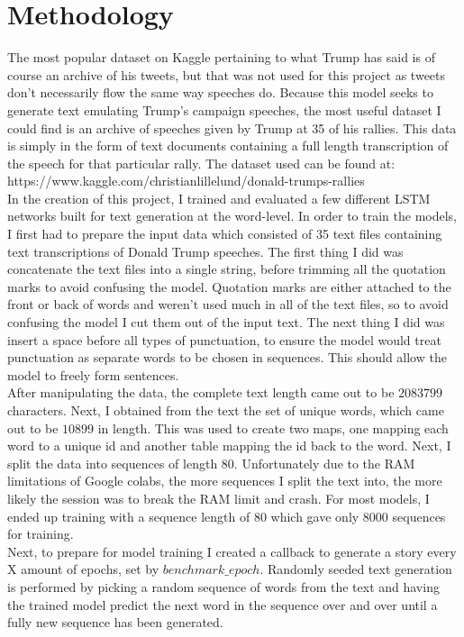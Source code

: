 \documentclass[a4paper]{article}
\begin{document}
\section{Methodology}

The most popular dataset on Kaggle pertaining to what Trump has said is of course an archive of his tweets, but that was not used for this project as tweets don't necessarily flow the same way speeches do. Because this model seeks to generate text emulating Trump's campaign speeches, the most useful dataset I could find is an archive of speeches given by Trump at 35 of his rallies. This data is simply in the form of text documents containing a full length transcription of the speech for that particular rally. The dataset used can be found at: https://www.kaggle.com/christianlillelund/donald-trumps-rallies \\

\noindent
In the creation of this project, I trained and evaluated a few different LSTM networks built for text generation at the word-level. In order to train the models, I first had to prepare the input data which consisted of 35 text files containing text transcriptions of Donald Trump speeches. The first thing I did was concatenate the text files into a single string, before trimming all the quotation marks to avoid confusing the model. Quotation marks are either attached to the front or back of words and weren't used much in all of the text files, so to avoid confusing the model I cut them out of the input text. The next thing I did was insert a space before all types of punctuation, to ensure the model would treat punctuation as separate words to be chosen in sequences. This should allow the model to freely form sentences. \\

\noindent
After manipulating the data, the complete text length came out to be $2083799$ characters. Next, I obtained from the text the set of unique words, which came out to be $10899$ in length. This was used to create two maps, one mapping each word to a unique id and another table mapping the id back to the word. Next, I split the data into sequences of length 80. Unfortunately due to the RAM limitations of Google colabs, the more sequences I split the text into, the more likely the session was to break the RAM limit and crash. For most models, I ended up training with a sequence length of 80 which gave only 8000 sequences for training. \\

\noindent
Next, to prepare for model training I created a callback to generate a story every X amount of epochs, set by $benchmark\_epoch$. Randomly seeded text generation is performed by picking a random sequence of words from the text and having the trained model predict the next word in the sequence over and over until a fully new sequence has been generated.  \\
\end{document}
